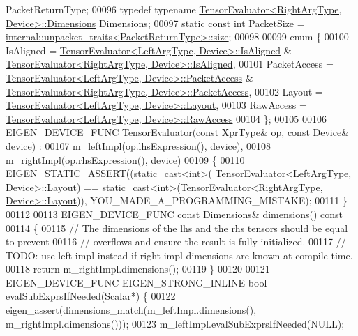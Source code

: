 \begin{DoxyCode}
      PacketReturnType;
00096   \textcolor{keyword}{typedef} \textcolor{keyword}{typename} \hyperlink{struct_eigen_1_1_tensor_evaluator}{TensorEvaluator<RightArgType, Device>::Dimensions}
       Dimensions;
00097   \textcolor{keyword}{static} \textcolor{keyword}{const} \textcolor{keywordtype}{int} PacketSize = 
      \hyperlink{struct_eigen_1_1internal_1_1unpacket__traits}{internal::unpacket\_traits<PacketReturnType>::size};
00098 
00099   \textcolor{keyword}{enum} \{
00100     IsAligned = \hyperlink{struct_eigen_1_1_tensor_evaluator}{TensorEvaluator<LeftArgType, Device>::IsAligned}
       & \hyperlink{struct_eigen_1_1_tensor_evaluator}{TensorEvaluator<RightArgType, Device>::IsAligned},
00101     PacketAccess = \hyperlink{struct_eigen_1_1_tensor_evaluator}{TensorEvaluator<LeftArgType, Device>::PacketAccess}
       & \hyperlink{struct_eigen_1_1_tensor_evaluator}{TensorEvaluator<RightArgType, Device>::PacketAccess},
00102     Layout = \hyperlink{struct_eigen_1_1_tensor_evaluator}{TensorEvaluator<LeftArgType, Device>::Layout},
00103     RawAccess = \hyperlink{struct_eigen_1_1_tensor_evaluator}{TensorEvaluator<LeftArgType, Device>::RawAccess}
00104   \};
00105 
00106   EIGEN\_DEVICE\_FUNC \hyperlink{struct_eigen_1_1_tensor_evaluator}{TensorEvaluator}(\textcolor{keyword}{const} XprType& op, \textcolor{keyword}{const} Device& device) :
00107       m\_leftImpl(op.lhsExpression(), device),
00108       m\_rightImpl(op.rhsExpression(), device)
00109   \{
00110     EIGEN\_STATIC\_ASSERT((static\_cast<int>(
      \hyperlink{struct_eigen_1_1_tensor_evaluator}{TensorEvaluator<LeftArgType, Device>::Layout}) == 
      static\_cast<int>(\hyperlink{struct_eigen_1_1_tensor_evaluator}{TensorEvaluator<RightArgType, Device>::Layout})), 
      YOU\_MADE\_A\_PROGRAMMING\_MISTAKE);
00111   \}
00112 
00113   EIGEN\_DEVICE\_FUNC \textcolor{keyword}{const} Dimensions& dimensions()\textcolor{keyword}{ const}
00114 \textcolor{keyword}{  }\{
00115     \textcolor{comment}{// The dimensions of the lhs and the rhs tensors should be equal to prevent}
00116     \textcolor{comment}{// overflows and ensure the result is fully initialized.}
00117     \textcolor{comment}{// TODO: use left impl instead if right impl dimensions are known at compile time.}
00118     \textcolor{keywordflow}{return} m\_rightImpl.dimensions();
00119   \}
00120 
00121   EIGEN\_DEVICE\_FUNC EIGEN\_STRONG\_INLINE \textcolor{keywordtype}{bool} evalSubExprsIfNeeded(Scalar*) \{
00122     eigen\_assert(dimensions\_match(m\_leftImpl.dimensions(), m\_rightImpl.dimensions()));
00123     m\_leftImpl.evalSubExprsIfNeeded(NULL);

\end{DoxyCode}
